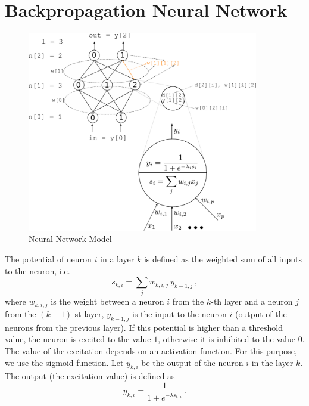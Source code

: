 \documentclass[12pt]{article}
\begin{document}
\section*{Backpropagation Neural Network}
\begin{figure}[h!]
\center
\includegraphics[width=0.9\textwidth]{drawing.pdf}
\caption{Neural Network Model}
\label{fig:1}
\end{figure}

The potential of neuron $i$ in a layer $k$ is defined as the weighted sum of all inputs to the neuron, i.e.
\begin{equation}
\label{eq:1}
s_{k,i} = \sum_{j} w_{k,i,j}\:  y_{k-1,j} \, ,
\end{equation}
where $w_{k,i,j}$ is the weight between a neuron $i$ from the $k$-th layer and a neuron $j$ from the $(k-1)$-st layer, $y_{k-1,j}$ is the input to the neuron $i$ (output of the neurons from the previous layer).
If this potential is higher than a threshold value, the neuron is excited to the value $1$, otherwise it is inhibited to the value $0$.
The value of the excitation depends on an activation function.
For this purpose, we use the sigmoid function.
Let $y_{k,i}$ be the output of the neuron $i$ in the layer $k$. 
The output (the excitation value) is defined as
\begin{equation}
\label{eq:2}
y_{k,i} = \frac{1}{1+e^{-\lambda s_{k,i}}} \, .
\end{equation}
\end{document}
